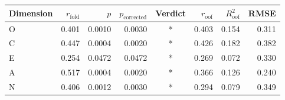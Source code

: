 \begin{tabular}{lrrrcrrr}
\toprule
Dimension & $r_{\mathrm{fold}}$ & $p$ & $p_{\mathrm{corrected}}$ & Verdict & $r_{\mathrm{oof}}$ & $R^{2}_{\mathrm{oof}}$ & RMSE \\
\midrule
O & 0.401 & 0.0010 & 0.0030 & * & 0.403 & 0.154 & 0.311 \\
C & 0.447 & 0.0004 & 0.0020 & * & 0.426 & 0.182 & 0.382 \\
E & 0.254 & 0.0472 & 0.0472 & * & 0.269 & 0.072 & 0.330 \\
A & 0.517 & 0.0004 & 0.0020 & * & 0.366 & 0.126 & 0.240 \\
N & 0.406 & 0.0012 & 0.0030 & * & 0.294 & 0.079 & 0.349 \\
\bottomrule
\end{tabular}

